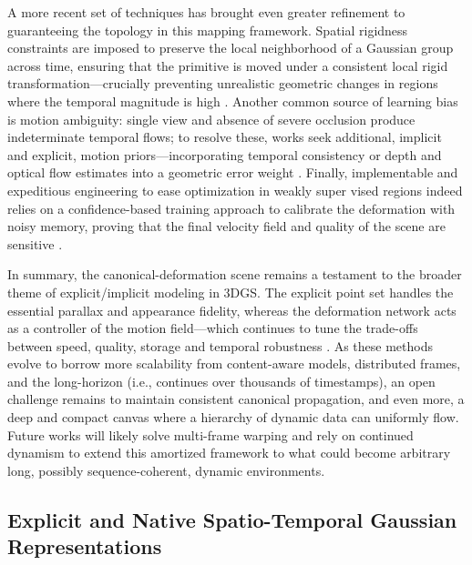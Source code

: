 \documentclass[11pt,a4paper]{article}
\begin{document}
A more recent set of techniques has brought even greater refinement to guaranteeing the topology in this mapping framework. Spatial rigidness constraints are imposed to preserve the local neighborhood of a Gaussian group across time, ensuring that the primitive is moved under a consistent local rigid transformation---crucially preventing unrealistic geometric changes in regions where the temporal magnitude is high \cite{arxiv:2412.20720v2,arxiv:2505.04668v1}. Another common source of learning bias is motion ambiguity: single view and absence of severe occlusion produce indeterminate temporal flows; to resolve these, works seek additional, implicit and explicit, motion priors---incorporating temporal consistency or depth and optical flow estimates into a geometric error weight \cite{arxiv:2405.17891v1}. Finally, implementable and expeditious engineering to ease optimization in weakly super vised regions indeed relies on a confidence-based training approach to calibrate the deformation with noisy memory, proving that the final velocity field and quality of the scene are sensitive \cite{arxiv:2606.00452v1}.

In summary, the canonical-deformation scene remains a testament to the broader theme of explicit/implicit modeling in 3DGS. The explicit point set handles the essential parallax and appearance fidelity, whereas the deformation network acts as a controller of the motion field---which continues to tune the trade-offs between speed, quality, storage and temporal robustness \cite{arxiv:2401.03890v2,arxiv:2401.03890v2}. As these methods evolve to borrow more scalability from content-aware models, distributed frames, and the long-horizon (i.e., continues over thousands of timestamps), an open challenge remains to maintain consistent canonical propagation, and even more, a deep and compact canvas where a hierarchy of dynamic data can uniformly flow. Future works will likely solve multi-frame warping and rely on continued dynamism to extend this amortized framework to what could become arbitrary long, possibly sequence-coherent, dynamic environments.


\subsection{Explicit and Native Spatio-Temporal Gaussian Representations}
\end{document}
